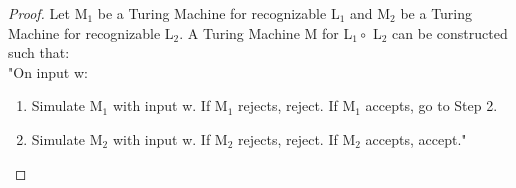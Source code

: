 ﻿\documentclass{article}
\begin{document}
\begin{enumerate}[a)]
\begin{proof}
Let M$_{1}$ be a Turing Machine for recognizable L$_{1}$ and M$_{2}$ be a Turing Machine for recognizable L$_{2}$.  A Turing Machine M for L$_{1} \circ $ L$_{2}$ can be constructed such that:
\\"On input w:

\begin{enumerate} [1.]
\item Simulate M$_{1}$ with input w. If M$_{1}$ rejects, reject. If M$_{1}$ accepts, go to Step 2.
\item Simulate M$_{2}$ with input w. If M$_{2}$ rejects, reject. If M$_{2}$ accepts, accept."
\end{enumerate}


\end{proof}
\end{enumerate}
\end{document}
